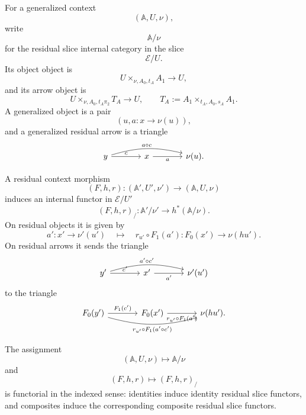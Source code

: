 For a generalized context
\[
    (\mathbb A,U,\nu),
\]
write
\[
    \mathbb A/\nu
\]
for the residual slice internal category in the slice
\[
    \mathcal E/U.
\]
Its object object is
\[
    U\times_{\nu,A_0,t_A}A_1\to U,
\]
and its arrow object is
\[
    U\times_{\nu,A_0,t_A\pi_2}T_A\to U,
    \qquad
    T_A:=A_1\times_{t_A,A_0,s_A}A_1.
\]
A generalized object is a pair
\[
    (u,a:x\to\nu(u)),
\]
and a generalized residual arrow is a triangle
\[
\begin{tikzcd}[column sep=large, row sep=large]
    y
        \arrow[r, "c"]
        \arrow[rr, "a\circ c", bend left=15]
    &
    x
        \arrow[r, "a"']
    &
    \nu(u).
\end{tikzcd}
\]

A residual context morphism
\[
    (F,h,r):
    (\mathbb A',U',\nu')
    \to
    (\mathbb A,U,\nu)
\]
induces an internal functor in \(\mathcal E/U'\)
\[
    (F,h,r)_{/}:
    \mathbb A'/\nu'
    \longrightarrow
    h^*(\mathbb A/\nu).
\]
On residual objects it is given by
\[
    a':x'\to\nu'(u')
    \quad\longmapsto\quad
    r_{u'}\circ F_1(a'):F_0(x')\to\nu(h u').
\]
On residual arrows it sends the triangle
\[
\begin{tikzcd}[column sep=large, row sep=large]
    y'
        \arrow[r, "c'"]
        \arrow[rr, "a'\circ c'", bend left=15]
    &
    x'
        \arrow[r, "a'"']
    &
    \nu'(u')
\end{tikzcd}
\]
to the triangle
\[
\begin{tikzcd}[column sep=large, row sep=large]
    F_0(y')
        \arrow[r, "F_1(c')"]
        \arrow[rr, "{r_{u'}\circ F_1(a'\circ c')}"', bend right=15]
    &
    F_0(x')
        \arrow[r, "{r_{u'}\circ F_1(a')}"']
    &
    \nu(h u').
\end{tikzcd}
\]

\begin{lemma}
\label{lem:residual-slice-functoriality}
    The assignment
    \[
        (\mathbb A,U,\nu)\longmapsto \mathbb A/\nu
    \]
    and
    \[
        (F,h,r)\longmapsto (F,h,r)_{/}
    \]
    is functorial in the indexed sense: identities induce identity residual
    slice functors, and composites induce the corresponding composite residual
    slice functors.
\end{lemma}

